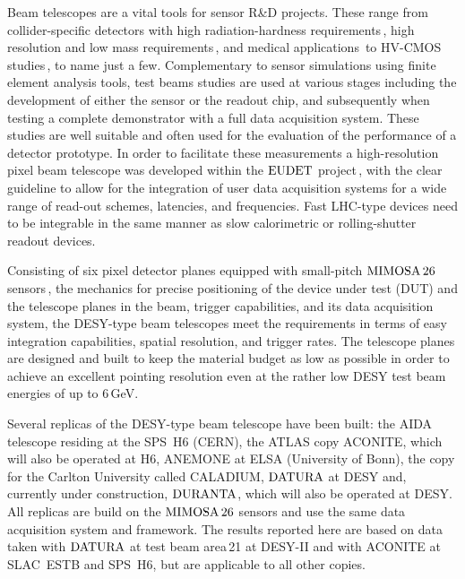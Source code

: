 

Beam telescopes are a vital tools for sensor R\&D projects. 
These range from collider-specific detectors with high radiation-hardness requirements\,\cite{1748-0221-9-12-C12001},
 high resolution and low mass requirements\,\cite{???}, and medical applications\,\cite{Ballabriga2011S15} to HV-CMOS studies\,\cite{1748-0221-7-08-C08002}, to name just a few.
Complementary to sensor simulations using finite element analysis tools, test beams studies are used at various stages including the development of either the sensor or the readout chip,
 and subsequently when testing a complete demonstrator with a full data acquisition system. 
These studies are well suitable and often used for the evaluation of the performance of a detector prototype. %
In order to facilitate these measurements a high-resolution pixel beam telescope was developed within the $\textrm{EUDET}$ project\,\cite{ref:eudetreport200902},
 with the clear guideline to allow for the integration of user data acquisition systems for a wide range of read-out schemes, latencies, and frequencies. 
Fast LHC-type devices need to be integrable in the same manner as slow calorimetric or rolling-shutter readout devices. 

Consisting of six pixel detector planes equipped with small-pitch $\textrm{MIMOSA\,26}$ sensors\,\cite{HuGuo2010480},
 the mechanics for precise positioning of the device under test (DUT) and the telescope planes in the beam, trigger capabilities, and its data acquisition system, 
 the DESY-type beam telescopes meet the requirements in terms of easy integration capabilities, spatial resolution, and trigger rates. 
The telescope planes are designed and built to keep the material budget as low as possible in order to achieve an excellent pointing resolution
 even at the rather low DESY test beam energies of up to 6\,GeV.

Several replicas of the DESY-type beam telescope have been built:
 the AIDA telescope residing at the SPS~H6 (CERN), the ATLAS copy ACONITE, which will also be operated at H6, ANEMONE at ELSA (University of Bonn), the copy for the Carlton University called CALADIUM, 
 $\textrm{DATURA}$ at DESY and, currently under construction, $\textrm{DURANTA}$, which will also be operated at DESY. 
All replicas are build on the $\textrm{MIMOSA\,26}$ sensors and use the same data acquisition system and framework. 
The results reported here are based on data taken with $\textrm{DATURA}$ at test beam area\,21 at {DESY-II} and with ACONITE at SLAC~ESTB and SPS~H6, but are applicable to all other copies. 

